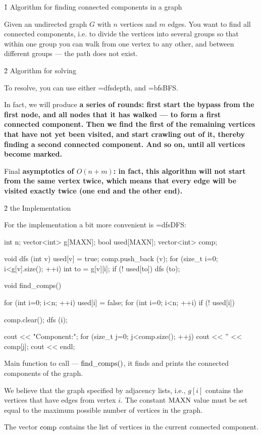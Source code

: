 \h1{ Algorithm for finding connected components in a graph }

Given an undirected graph $G$ with $n$ vertices and $m$ edges. You want to find all connected components, i.e. to divide the vertices into several groups so that within one group you can walk from one vertex to any other, and between different groups --- the path does not exist.


\h2{ Algorithm for solving }

To resolve, you can use either \algohref=dfs{depth}, and \algohref=bfs{BFS}.

In fact, we will produce \bf{a series of rounds}: first start the bypass from the first node, and all nodes that it has walked --- to form a first connected component. Then we find the first of the remaining vertices that have not yet been visited, and start crawling out of it, thereby finding a second connected component. And so on, until all vertices become marked.

Final \bf{asymptotics} of $O(n + m)$: in fact, this algorithm will not start from the same vertex twice, which means that every edge will be visited exactly twice (one end and the other end).


\h2{ the Implementation }

For the implementation a bit more convenient is \algohref=dfs{DFS}:

\code
int n;
vector<int> g[MAXN];
bool used[MAXN];
vector<int> comp;

void dfs (int v) {
used[v] = true;
comp.push_back (v);
for (size_t i=0; i<g[v].size(); ++i) {
int to = g[v][i];
if (! used[to])
dfs (to);
}
}

void find_comps() {
for (int i=0; i<n; ++i)
used[i] = false;
for (int i=0; i<n; ++i)
if (! used[i]) {
comp.clear();
dfs (i);

cout << "Component:";
for (size_t j=0; j<comp.size(); ++j)
cout << '' << comp[j];
cout << endl;
}
}
\endcode

Main function to call --- $\rm find\_comps()$, it finds and prints the connected components of the graph.

We believe that the graph specified by adjacency lists, i.e., $g[i]$ contains the vertices that have edges from vertex $i$. The constant $\rm MAXN$ value must be set equal to the maximum possible number of vertices in the graph.

The vector $\rm comp$ contains the list of vertices in the current connected component.